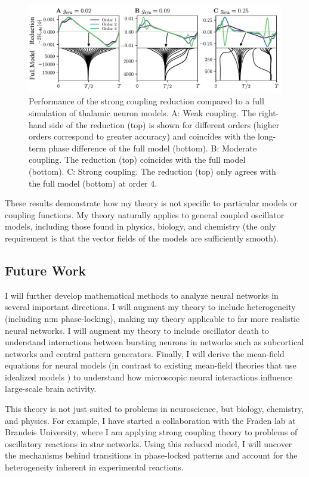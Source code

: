 \documentclass[a4paper,11pt]{article}
\begin{document}
	\begin{figure}[ht!]
		\centering
		\includegraphics[width=\textwidth]{figures/thal_h_edited.pdf}
		\caption{Performance of the strong coupling reduction compared to a full simulation of thalamic neuron models. A: Weak coupling. The right-hand side of the reduction (top) is shown for different orders (higher orders correspond to greater accuracy) and coincides with the long-term phase difference of the full model (bottom). B: Moderate coupling. The reduction (top) coincides with the full model (bottom). C: Strong coupling. The reduction (top) only agrees with the full model (bottom) at order 4. }\label{fig:thal}
	\end{figure}
	
	These results demonstrate how my theory is not specific to particular models or coupling functions. My theory naturally applies to general coupled oscillator models, including those found in physics, biology, and chemistry (the only requirement is that the vector fields of the models are sufficiently smooth).
	
	\subsection{Future Work}
	
	I will further develop mathematical methods to analyze neural networks in several important directions. I will augment my theory to include heterogeneity (including n:m phase-locking), making my theory applicable to far more realistic neural networks. I will augment my theory to include oscillator death to understand interactions between bursting neurons in networks such as subcortical networks and central pattern generators. Finally, I will derive the mean-field equations for neural models (in contrast to existing mean-field theories that use idealized models \cite{ott2008low}) to understand how microscopic neural interactions influence large-scale brain activity.
	
	This theory is not just suited to problems in neuroscience, but biology, chemistry, and physics. For example, I have started a collaboration with the Fraden lab at Brandeis University, where I am applying strong coupling theory to problems of oscillatory reactions in star networks. Using this reduced model, I will uncover the mechanisms behind transitions in phase-locked patterns and account for the heterogeneity inherent in experimental reactions.
	
\end{document}

